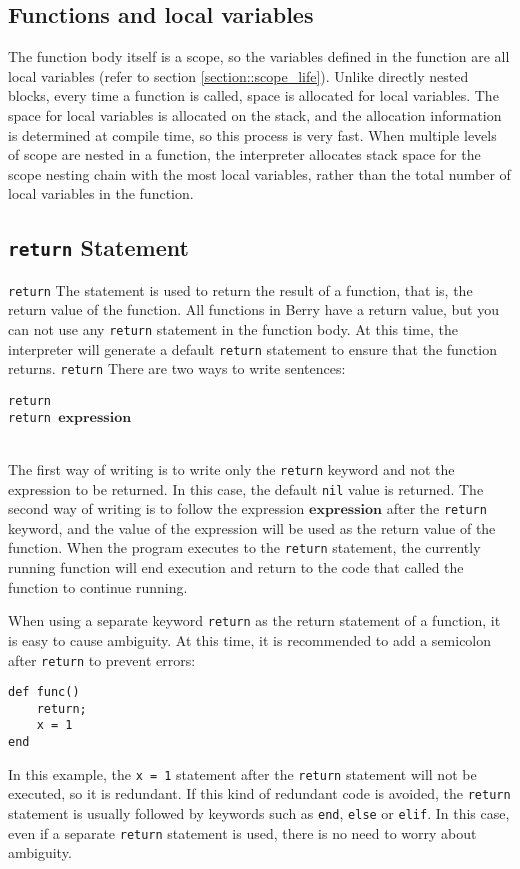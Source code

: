 \subsection {Functions and local variables}

The function body itself is a scope, so the variables defined in the function are all local variables (refer to section \ref{section::scope_life}). Unlike directly nested blocks, every time a function is called, space is allocated for local variables. The space for local variables is allocated on the stack, and the allocation information is determined at compile time, so this process is very fast. When multiple levels of scope are nested in a function, the interpreter allocates stack space for the scope nesting chain with the most local variables, rather than the total number of local variables in the function.

\subsection{\texttt{return} Statement}

\texttt{return} The statement is used to return the result of a function, that is, the return value of the function. All functions in Berry have a return value, but you can not use any \texttt{return} statement in the function body. At this time, the interpreter will generate a default \texttt{return} statement to ensure that the function returns. \texttt{return} There are two ways to write sentences:
\begin{algorithm}
    \texttt{return} \\
    \texttt{return }$\bm{expression}$
\end{algorithm}\vspace{-0.6em}\\
The first way of writing is to write only the \texttt{return} keyword and not the expression to be returned. In this case, the default \texttt{nil} value is returned. The second way of writing is to follow the expression $\bm{expression}$ after the \texttt{return} keyword, and the value of the expression will be used as the return value of the function. When the program executes to the \texttt{return} statement, the currently running function will end execution and return to the code that called the function to continue running.

When using a separate keyword \texttt{return} as the return statement of a function, it is easy to cause ambiguity. At this time, it is recommended to add a semicolon after \texttt{return} to prevent errors:
\begin{lstlisting}[language=berry, numbers=none]
def func()
    return;
    x = 1
end
\end{lstlisting}
In this example, the \texttt{x = 1} statement after the \texttt{return} statement will not be executed, so it is redundant. If this kind of redundant code is avoided, the \texttt{return} statement is usually followed by keywords such as \texttt{end}, \texttt{else} or \texttt{elif}. In this case, even if a separate \texttt{return} statement is used, there is no need to worry about ambiguity.

